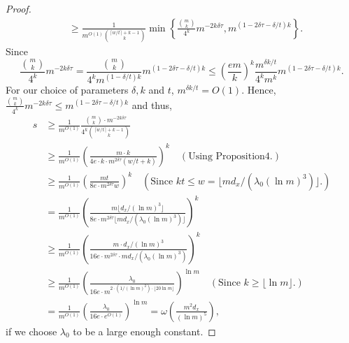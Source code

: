 \documentclass[10pt,a4paper]{article}
\begin{document}
\begin{proof}
\begin{align*}
&\ge\frac1{m^{O(1)}\binom{\lceil w/t\rceil+k-1}k}
\min\left\{\frac{\binom mk}{4^k}m^{-2k\delta\tau},
m^{(1-2\delta\tau-\delta/t)k}\right\}.
\end{align*}
Since
\[
\frac{\binom mk}{4^k}m^{-2k\delta\tau}
=\frac{\binom mk}{4^km^{(1-\delta/t)k}}m^{(1-2\delta\tau-\delta/t)k}
\le\left(\frac{em}k\right)^k\frac{m^{\delta k/t}}{4^km^k}
m^{(1-2\delta\tau-\delta/t)k}.
\]
For our choice of parameters $\delta,k$ and $t$, $m^{\delta k/t}=O(1)$. Hence, $\frac{\binom mk}{4^k}m^{-2k\delta\tau}\le m^{(1-2\delta\tau-\delta/t)k}$ and thus,
\begin{align*}
s&\ge\frac1{m^{O(1)}}\frac{\binom mk\cdot m^{-2k\delta\tau}}{4^k\binom{\lceil w/t\rceil+k-1}k}\\
&\ge\frac1{m^{O(1)}}\left(\frac{m\cdot k}{4e\cdot k\cdot m^{2\delta\tau}(w/t+k)}\right)^k\quad(\text{Using Proposition4.})\\
&\ge\frac1{m^{O(1)}}\left(\frac{mt}{8e\cdot m^{2\delta\tau}w}\right)^k
\quad(\text{Since }kt\le w=\lfloor md_x/(\lambda_0(\ln m)^3)\rfloor.)\\
&=\frac1{m^{O(1)}}\left(\frac{m\lfloor d_x/(\ln m)^3\rfloor}
{8e\cdot m^{2\delta\tau}\lfloor md_x/(\lambda_0(\ln m)^3)\rfloor}\right)^k\\
&\ge\frac1{m^{O(1)}}\left(\frac{m\cdot d_x/(\ln m)^3}
{16e\cdot m^{2\delta\tau}\cdot md_x/(\lambda_0(\ln m)^3)}\right)^k\\
&\ge\frac1{m^{O(1)}}\left(\frac{\lambda_0}{16e\cdot m^{2\cdot(1/(\ln m)^2)\cdot\lfloor20\ln m\rfloor}}\right)^{\ln m}
\quad(\text{Since }k\ge\lfloor\ln m\rfloor.)\\
&=\frac1{m^{O(1)}}\left(\frac{\lambda_0}{16e\cdot e^{O(1)}}\right)^{\ln m}
=\omega\left(\frac{m^2d_x}{(\ln m)^5}\right),
\end{align*}
if we choose $\lambda_0$ to be a large enough constant.
\end{proof}
\end{document}
